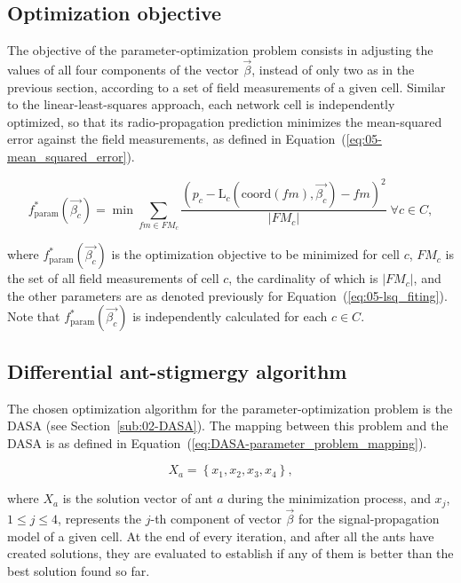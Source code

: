 \subsection{Optimization objective}

The objective of the parameter-optimization problem consists in adjusting
the values of all four components of the vector $\vec{\beta}$, instead
of only two as in the previous section, according to a set of field
measurements of a given cell. Similar to the linear-least-squares
approach, each network cell is independently optimized, so that its
radio-propagation prediction minimizes the mean-squared error against
the field measurements, as defined in Equation~(\ref{eq:05-mean_squared_error}).

\begin{equation}
f_{\mathrm{param}}^{*}(\vec{\beta_{c}})=\min\sum_{fm\in FM_{c}}\frac{(p_{c}-\mathrm{L}{}_{c}(\mathrm{coord}(fm),\vec{\beta_{c}})-fm)^{2}}{\vert FM_{c}\vert}\;\forall c\in C,\label{eq:05-mean_squared_error}
\end{equation}


\noindent where $f_{\mathrm{param}}^{*}(\vec{\beta_{c}})$
is the optimization objective to be minimized for cell $c$, $FM_{c}$
is the set of all field measurements of cell $c$, the cardinality
of which is $\vert FM_{c}\vert$, and the other parameters are as
denoted previously for Equation~(\ref{eq:05-lsq_fiting}). Note that
$f_{\mathrm{param}}^{*}(\vec{\beta_{c}})$ is independently calculated
for each $c\in C$.


\subsection{Differential ant-stigmergy algorithm}

The chosen optimization algorithm for the parameter-optimization problem
is the DASA (see Section~\ref{sub:02-DASA}). The mapping between
this problem and the DASA is as defined in Equation~(\ref{eq:DASA-parameter_problem_mapping}).

\begin{equation}
X_{a}=\left\{ x_{1},x_{2},x_{3},x_{4}\right\} ,\label{eq:DASA-parameter_problem_mapping}
\end{equation}


\noindent where $X_{a}$ is the solution vector of ant $a$ during
the minimization process, and $x_{j}$, $1\le j\le4$, represents
the $j$-th component of vector $\vec{\beta}$ for the signal-propagation
model of a given cell. At the end of every iteration, and after all
the ants have created solutions, they are evaluated to establish if
any of them is better than the best solution found so far.

